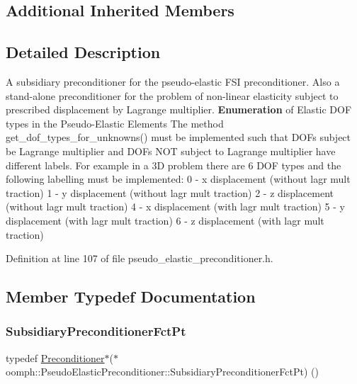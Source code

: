 \subsection*{Additional Inherited Members}


\subsection{Detailed Description}
A subsidiary preconditioner for the pseudo-\/elastic F\+SI preconditioner. Also a stand-\/alone preconditioner for the problem of non-\/linear elasticity subject to prescribed displacement by Lagrange multiplier. {\bfseries Enumeration} of Elastic D\+OF types in the Pseudo-\/\+Elastic Elements The method get\+\_\+dof\+\_\+types\+\_\+for\+\_\+unknowns() must be implemented such that D\+O\+Fs subject be Lagrange multiplier and D\+O\+Fs N\+OT subject to Lagrange multiplier have different labels. For example in a 3D problem there are 6 D\+OF types and the following labelling must be implemented\+: 0 -\/ x displacement (without lagr mult traction) 1 -\/ y displacement (without lagr mult traction) 2 -\/ z displacement (without lagr mult traction) 4 -\/ x displacement (with lagr mult traction) 5 -\/ y displacement (with lagr mult traction) 6 -\/ z displacement (with lagr mult traction) 

Definition at line 107 of file pseudo\+\_\+elastic\+\_\+preconditioner.\+h.



\subsection{Member Typedef Documentation}
\mbox{\label{classoomph_1_1PseudoElasticPreconditioner_a1462e1ef48ed2668c06dfd36c783d1a5}} 
\subsubsection{\texorpdfstring{Subsidiary\+Preconditioner\+Fct\+Pt}{SubsidiaryPreconditionerFctPt}}
{\footnotesize\ttfamily typedef \hyperlink{classoomph_1_1Preconditioner}{Preconditioner}$\ast$($\ast$ oomph\+::\+Pseudo\+Elastic\+Preconditioner\+::\+Subsidiary\+Preconditioner\+Fct\+Pt) ()}



